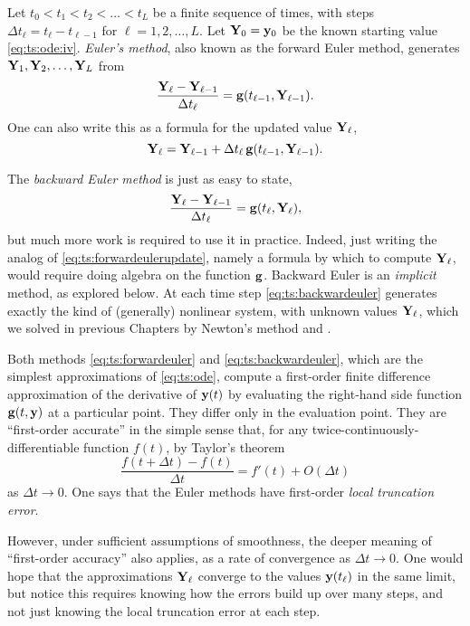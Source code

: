 Let $t_0<t_1<t_2<\dots<t_L$ be a finite sequence of times, with steps $\Delta t_\ell = t_\ell - t_{\ell-1}$ for $\ell=1,2,\dots,L$.  Let $\mathbf{Y}_0 = \mathbf{y}_0$ be the known starting value  \eqref{eq:ts:ode:iv}.  \emph{Euler's method}, also known as the forward Euler method, generates $\mathbf{Y}_1,\mathbf{Y}_2,\dots,\mathbf{Y}_L$ from
\begin{equation}
\frac{\mathbf{Y}_\ell - \mathbf{Y}_{\ell-1}}{\Delta t_\ell} = \mathbf{g}(t_{\ell-1},\mathbf{Y}_{\ell-1}). \label{eq:ts:forwardeuler}
\end{equation}
One can also write this as a formula for the updated value $\mathbf{Y}_\ell$,
\begin{equation}
\mathbf{Y}_\ell = \mathbf{Y}_{\ell-1} + \Delta t_\ell \, \mathbf{g}(t_{\ell-1},\mathbf{Y}_{\ell-1}). \label{eq:ts:forwardeulerupdate}
\end{equation}

The \emph{backward Euler method} is just as easy to state,
\begin{equation}
\frac{\mathbf{Y}_\ell - \mathbf{Y}_{\ell-1}}{\Delta t_\ell} = \mathbf{g}(t_{\ell},\mathbf{Y}_{\ell}),  \label{eq:ts:backwardeuler}
\end{equation}
but much more work is required to use it in practice.  Indeed, just writing the analog of \eqref{eq:ts:forwardeulerupdate}, namely a formula by which to compute $\mathbf{Y}_\ell$, would require doing algebra on the function $\mathbf{g}$.  Backward Euler is an \emph{implicit} method, as explored below.  At each time step \eqref{eq:ts:backwardeuler} generates exactly the kind of (generally) nonlinear system, with unknown values $\mathbf{Y}_\ell$, which we solved in previous Chapters by Newton's method and \pSNES.

Both methods \eqref{eq:ts:forwardeuler} and \eqref{eq:ts:backwardeuler}, which are the simplest approximations of \eqref{eq:ts:ode}, compute a first-order finite difference approximation of the derivative of $\mathbf{y}(t)$ by evaluating the right-hand side function $\mathbf{g}(t,\mathbf{y})$ at a particular point.  They differ only in the evaluation point.  They are ``first-order accurate'' in the simple sense that, for any twice-continuously-differentiable function $f(t)$, by Taylor's theorem
    $$\frac{f(t+\Delta t) - f(t)}{\Delta t} = f'(t) + O(\Delta t)$$
as $\Delta t \to 0$.  One says that the Euler methods have first-order \emph{local truncation error}.

However, under sufficient assumptions of smoothness, the deeper meaning of ``first-order accuracy'' also applies, as a rate of convergence as $\Delta t\to 0$.  One would hope that the approximations $\mathbf{Y}_\ell$ converge to the values $\mathbf{y}(t_\ell)$ in the same limit, but notice this requires knowing how the errors build up over many steps, and not just knowing the local truncation error at each step.

